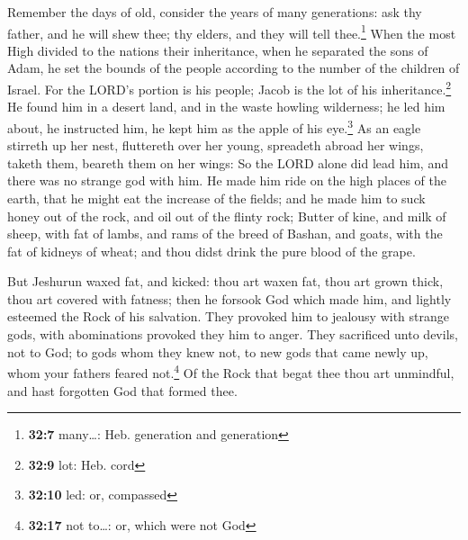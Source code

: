  Remember the days of old, consider the years of many
generations: ask thy father, and he will shew thee; thy elders, and they
will tell thee.\footnote{\textbf{32:7} many\ldots: Heb. generation and
  generation}  When the most High divided to the nations
their inheritance, when he separated the sons of Adam, he set the bounds
of the people according to the number of the children of Israel.
 For the LORD's portion is his people; Jacob is the lot of
his inheritance.\footnote{\textbf{32:9} lot: Heb. cord} 
He found him in a desert land, and in the waste howling wilderness; he
led him about, he instructed him, he kept him as the apple of his
eye.\footnote{\textbf{32:10} led: or, compassed}  As an
eagle stirreth up her nest, fluttereth over her young, spreadeth abroad
her wings, taketh them, beareth them on her wings:  So
the LORD alone did lead him, and there was no strange god with him.
 He made him ride on the high places of the earth, that
he might eat the increase of the fields; and he made him to suck honey
out of the rock, and oil out of the flinty rock;  Butter
of kine, and milk of sheep, with fat of lambs, and rams of the breed of
Bashan, and goats, with the fat of kidneys of wheat; and thou didst
drink the pure blood of the grape.

 But Jeshurun waxed fat, and kicked: thou art waxen fat,
thou art grown thick, thou art covered with fatness; then he forsook God
which made him, and lightly esteemed the Rock of his salvation.
 They provoked him to jealousy with strange gods, with
abominations provoked they him to anger.  They sacrificed
unto devils, not to God; to gods whom they knew not, to new gods that
came newly up, whom your fathers feared not.\footnote{\textbf{32:17} not
  to\ldots: or, which were not God}  Of the Rock that
begat thee thou art unmindful, and hast forgotten God that formed thee.

